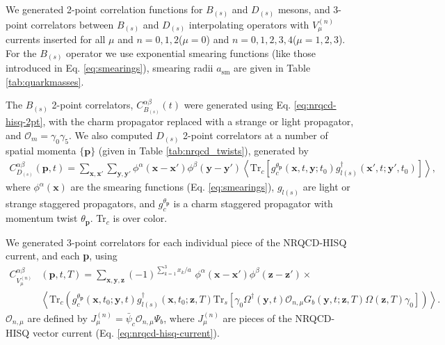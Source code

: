 We generated 2-point correlation functions for $B_{(s)}$ and $D_{(s)}$ mesons, and 3-point correlators between $B_{(s)}$ and $D_{(s)}$ interpolating operators with $V^{(n)}_{\mu}$ currents inserted for all $\mu$ and $n=0,1,2$($\mu=0$) and $n=0,1,2,3,4$($\mu=1,2,3$). For the $B_{(s)}$ operator we use exponential smearing functions (like those introduced in Eq. \eqref{eq:smearings}), smearing radii $a_{\text{sm}}$ are given in Table \ref{tab:quarkmasses}.

The $B_{(s)}$ 2-point correlators, $C_{B_{(s)}}^{\alpha\beta}(t)$ were generated using Eq. \eqref{eq:nrqcd-hisq-2pt}, with the charm propagator replaced with a strange or light propagator, and $\mathcal{O}_{m} = \gamma_0\gamma_5$. We also computed $D_{(s)}$ 2-point correlators at a number of spatial momenta $\{{\textbf{p}}\}$ (given in Table \ref{tab:nrqcd_twists}), generated by
\begin{align}
  C_{D_{(s)}}^{\alpha\beta}({\textbf{p}},t) = \sum_{{\textbf{x}},{\textbf{x}}'}\sum_{{\textbf{y}},{\textbf{y}}'} \phi^{\alpha}({\textbf{x}}-{\textbf{x}}')\phi^{\beta}({\textbf{y}}-{\textbf{y}}') \left\langle \text{Tr}_c[g_c^{\theta_{\textbf{p}}}({\textbf{x}},t,{\textbf{y}};t_0) g^{\dagger}_{l(s)}({\textbf{x}}',t;{\textbf{y}}',t_0) ]\right\rangle,
\end{align}
where $\phi^{\alpha}({\textbf{x}})$ are the smearing functions (Eq. \eqref{eq:smearings}), $g_{l(s)}$ are light or strange staggered propagators, and $g_c^{\theta_{\textbf{p}}}$ is a charm staggered propagator with momentum twist $\theta_{\textbf{p}}$. Tr$_c$ is over color.

We generated 3-point correlators for each individual piece of the NRQCD-HISQ current, and each {\textbf{p}}, using
\begin{align}
  C_{V_{\mu}^{(n)}}^{\alpha\beta} &({\textbf{p}},t,T) = \sum_{\textbf{x},\textbf{y},\textbf{z}} (-1)^{\sum_{k=1}^3 x_k/a} \,\,\phi^{\alpha}({\textbf{x}}-{\textbf{x}}') \phi^{\beta}({\textbf{z}}-{\textbf{z}}')\times \\ \nonumber &\left\langle \text{Tr}_c\left( g_c^{\theta_{\textbf{p}}}({\textbf{x}},t_0;{\textbf{y}},t) g_{l(s)}^{\dagger}({\textbf{x}},t_0;{\textbf{z}},T) \text{Tr}_s\left[ \gamma_0 \Omega^{\dagger}({\textbf{y}},t) \mathcal{O}_{n,\mu}G_b({\textbf{y}},t;{\textbf{z}},T) \Omega({\textbf{z}},T)\gamma_0 \right] \right) \right\rangle.
\end{align}
$\mathcal{O}_{n,\mu}$ are defined by $J_{\mu}^{(n)} = \bar{\psi}_c \mathcal{O}_{n,\mu} \Psi_b$, where $J_{\mu}^{(n)}$ are pieces of the NRQCD-HISQ vector current (Eq. \eqref{eq:nrqcd-hisq-current}).

